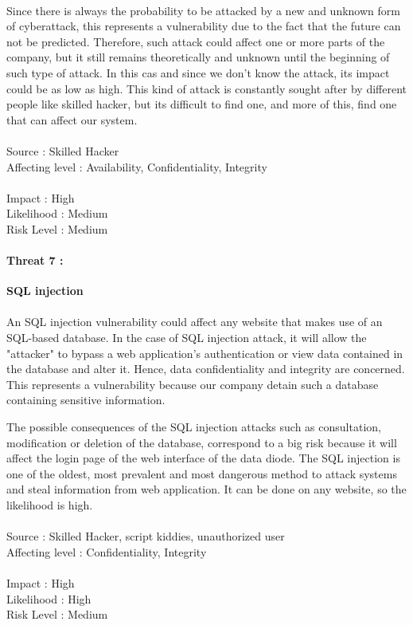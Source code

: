 \documentclass[a4paper,10pt]{article}
\begin{document}
\paragraph{}Since there is always the probability to be attacked by a new and unknown form of cyberattack, this represents a vulnerability due to the fact that the future can not be predicted. Therefore, such attack could affect one or more parts of the company, but it still remains theoretically and unknown until the beginning of such type of attack.
In this cas and since we don't know the attack, its impact could be as low as high. This kind of attack is constantly sought after by different people like skilled hacker, but its difficult to find one, and more of this, find one that can affect our system. \\ \\
Source : Skilled Hacker \\ 
Affecting level : Availability, Confidentiality, Integrity  \\ \\
Impact : High \\
Likelihood : Medium \\
Risk Level : Medium


\paragraph{Threat 7 :}  \textbf{SQL injection} 
\paragraph{}An SQL injection vulnerability could affect any website that makes use of an SQL-based database.
In the case of SQL injection attack, it will allow the "attacker" to bypass a web application's authentication or view data contained in the database and alter it. Hence, data confidentiality and integrity are concerned. This represents a vulnerability because our company detain such a database containing sensitive information.

The possible consequences of the SQL injection attacks such as consultation, modification or deletion of the database, correspond to a big risk because it will affect the login page of the web interface of the data diode. The SQL injection is one of the oldest, most prevalent and most dangerous method to attack systems and steal information from web application. It can be done on any website, so the likelihood is high.\\ \\
Source : Skilled Hacker, script kiddies, unauthorized user \\ 
Affecting level : Confidentiality, Integrity \\ \\
Impact : High \\
Likelihood : High \\
Risk Level : Medium
\end{document}
